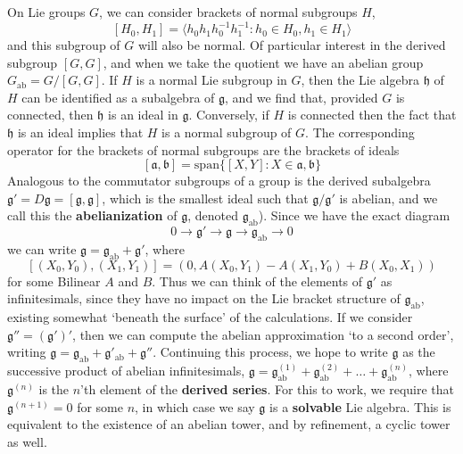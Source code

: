 On Lie groups $G$, we can consider brackets of normal subgroups $H$,
%
\[ [H_0,H_1] = \langle h_0h_1h_0^{-1}h_1^{-1} : h_0 \in H_0, h_1 \in H_1 \rangle \]
%
and this subgroup of $G$ will also be normal. Of particular interest in the derived subgroup $[G,G]$, and when we take the quotient we have an abelian group $G_{\text{ab}} = G/[G,G]$. If $H$ is a normal Lie subgroup in $G$, then the Lie algebra $\mathfrak{h}$ of $H$ can be identified as a subalgebra of $\mathfrak{g}$, and we find that, provided $G$ is connected, then $\mathfrak{h}$ is an ideal in $\mathfrak{g}$. Conversely, if $H$ is connected then the fact that $\mathfrak{h}$ is an ideal implies that $H$ is a normal subgroup of $G$. The corresponding operator for the brackets of normal subgroups are the brackets of ideals
%
\[ [\mathfrak{a}, \mathfrak{b}] = \text{span} \{ [X,Y] : X \in \mathfrak{a}, \mathfrak{b} \} \]
%
Analogous to the commutator subgroups of a group is the derived subalgebra $\mathfrak{g}' = D\mathfrak{g} = [\mathfrak{g}, \mathfrak{g}]$, which is the smallest ideal such that $\mathfrak{g}/\mathfrak{g}'$ is abelian, and we call this the {\bf abelianization} of $\mathfrak{g}$, denoted $\mathfrak{g}_{\text{ab}}$). Since we have the exact diagram
%
\[ 0 \to \mathfrak{g}' \to \mathfrak{g} \to \mathfrak{g}_{\text{ab}} \to 0 \]
%
we can write $\mathfrak{g} = \mathfrak{g}_{\text{ab}} + \mathfrak{g}'$, where
%
\[ [(X_0,Y_0),(X_1,Y_1)] = (0, A(X_0,Y_1) - A(X_1,Y_0) + B(X_0,X_1)) \]
%
for some Bilinear $A$ and $B$. Thus we can think of the elements of $\mathfrak{g}'$ as infinitesimals, since they have no impact on the Lie bracket structure of $\mathfrak{g}_{\text{ab}}$, existing somewhat `beneath the surface' of the calculations. If we consider $\mathfrak{g}'' = (\mathfrak{g}')'$, then we can compute the abelian approximation `to a second order', writing $\mathfrak{g} = \mathfrak{g}_{\text{ab}} + \mathfrak{g}'_{\text{ab}} + \mathfrak{g}''$. Continuing this process, we hope to write $\mathfrak{g}$ as the successive product of abelian infinitesimals, $\mathfrak{g} = \mathfrak{g}^{(1)}_{\text{ab}} + \mathfrak{g}^{(2)}_{\text{ab}} + \dots + \mathfrak{g}^{(n)}_{\text{ab}}$, where $\mathfrak{g}^{(n)}$ is the $n$'th element of the {\bf derived series}. For this to work, we require that $\mathfrak{g}^{(n+1)} = 0$ for some $n$, in which case we say $\mathfrak{g}$ is a {\bf solvable} Lie algebra. This is equivalent to the existence of an abelian tower, and by refinement, a cyclic tower as well.

